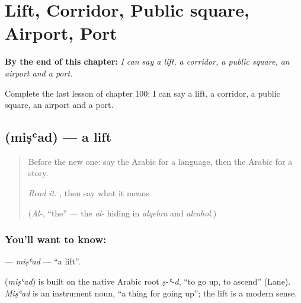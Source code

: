 
\chapter{Lift, Corridor, Public square, Airport, Port}
\label{ch:ar-lift-corridor-public-square-airport-port}

\begin{chapteropening}
\textbf{By the end of this chapter:} \emph{I can say a lift, a corridor, a public square, an airport and a port.}

Complete the last lesson of chapter 100: I can say a lift, a corridor, a public square, an airport and a port.
\end{chapteropening}

\section[\texorpdfstring{\ar{مصعد} (miṣʿad)}{مصعد (miṣʿad)}]{ (miṣʿad) — a lift}

\label{lesson:AR-C100-misad}



\begin{quote}
Before the new one: say the Arabic for a language, then the Arabic for a story.

\emph{Read it:} \textbf{}, then say what it means

(\emph{Al-}, \textquotedblleft{}the\textquotedblright{} — the \emph{al-} hiding in \emph{algebra} and \emph{alcohol}.)
\end{quote}

\subsection*{You'll want to know: }
\textbf{} — \emph{miṣʿad} — \textquotedblleft{}a lift\textquotedblright{}.

\begin{cousinweb}
\textbf{} (\emph{miṣʿad}) is built on the native Arabic root \emph{ṣ-ʿ-d}, \textquotedblleft{}to go up, to ascend\textquotedblright{} (Lane). \emph{Miṣʿad} is an instrument noun, \textquotedblleft{}a thing for going up\textquotedblright{}; the lift is a modern sense.
\end{cousinweb}


